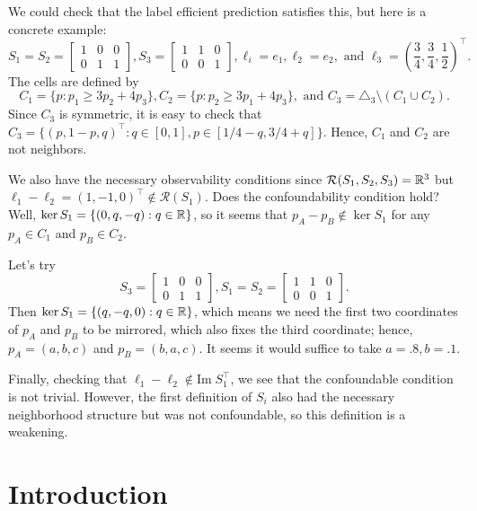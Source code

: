 \documentclass[11pt]{article}
\newcommand{\im}{{\mathrm{Im}\;}}
\begin{document}
We could check that the label efficient prediction satisfies this, but here is a concrete example:
\[
  S_1 = S_2 =
  \begin{bmatrix}
    1&0&0\\
    0&1&1
  \end{bmatrix},
  S_3 =
  \begin{bmatrix}
    1&1&0\\
    0&0&1
  \end{bmatrix},
  \ell_i = e_1, \ell_2 = e_2,
  \text{ and } \ell_3 = (\frac34, \frac34, \frac12)^\top.
\]
The cells are defined by
\[
  C_1 = \{ p: p_1 \geq 3 p_2 + 4 p_3\},
  C_2 = \{ p: p_2 \geq 3 p_1 + 4 p_3\},
  \text{ and } C_3 = \triangle_3 \setminus (C_1 \cup C_2).
\]
Since $C_3$ is symmetric, it is easy to check that $C_3 = \{(p,1-p,q)^\top:q\in[0,1], p\in[1/4-q,3/4+q]\}$. Hence, $C_1$ and $C_2$ are not neighbors.

We also have the necessary observability conditions since $\mathcal R( S_1, S_2, S_3) = \mathbb R^3$ but $\ell_1 - \ell_2 = (1,-1,0)^\top \notin \mathcal R(S_1)$. Does the confoundability condition hold? Well, $\ker S_1 = \{(0,q,-q):q\in\mathbb R\}$, so it seems that $p_A - p_B \notin \ker S_1$ for any $p_A\in C_1$ and $p_B \in C_2$.

Let's try 
\[
  S_3 = 
  \begin{bmatrix}
    1&0&0\\
    0&1&1
  \end{bmatrix},
  S_1 = S_2 =
  \begin{bmatrix}
    1&1&0\\
    0&0&1
  \end{bmatrix}.
\]
Then $\ker S_1 = \{(q,-q,0):q\in\mathbb R\}$, which means we need the first two coordinates of $p_A$ and $p_B$ to be mirrored, which also fixes the third coordinate; hence, $p_A = (a,b,c)$ and $p_B = (b,a,c)$. It seems it would suffice to take $a=.8,b=.1$.

Finally, checking that $\ell_1 - \ell_2 \notin \im S_1^\top$, we see that the confoundable condition is not trivial. However, the first definition of $S_i$ also had the necessary neighborhood structure but was not confoundable, so this definition is a weakening. 


\section{Introduction}
\end{document}

